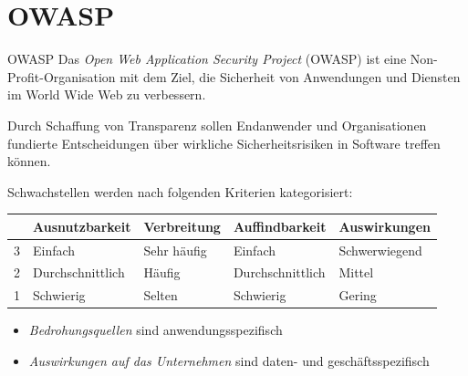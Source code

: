 \section{OWASP}

\begin{defi}{OWASP}
    Das \emph{Open Web Application Security Project} (OWASP) ist eine Non-Profit-Organisation mit dem Ziel, die Sicherheit von Anwendungen und Diensten im World Wide Web zu verbessern.

    Durch Schaffung von Transparenz sollen Endanwender und Organisationen fundierte Entscheidungen über wirkliche Sicherheitsrisiken in Software treffen können.

    Schwachstellen werden nach folgenden Kriterien kategorisiert:

    \begin{tabularx}{\textwidth}{|l||X|X|X|X|}
        \hline
          & Ausnutzbarkeit   & Verbreitung & Auffindbarkeit   & Auswirkungen  \\\hline\hline
        3 & Einfach          & Sehr häufig & Einfach          & Schwerwiegend \\\hline
        2 & Durchschnittlich & Häufig      & Durchschnittlich & Mittel        \\\hline
        1 & Schwierig        & Selten      & Schwierig        & Gering        \\\hline
    \end{tabularx}

    \begin{itemize}
        \item \emph{Bedrohungsquellen} sind anwendungsspezifisch
        \item \emph{Auswirkungen auf das Unternehmen} sind daten- und geschäftsspezifisch
    \end{itemize}
\end{defi}

